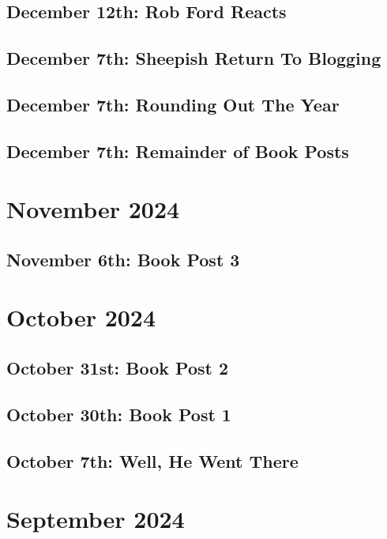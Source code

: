 \documentclass[12pt,letterpaper]{report}
\begin{document}
\subsection{December 12th: Rob Ford Reacts}

\subsection{December 7th: Sheepish Return To Blogging}

\subsection{December 7th: Rounding Out The Year}

\subsection{December 7th: Remainder of Book Posts}

\section{November 2024}
\subsection{November 6th: Book Post 3}

\section{October 2024}
\subsection{October 31st: Book Post 2}

\subsection{October 30th: Book Post 1}

\subsection{October 7th: Well, He Went There}

\section{September 2024}
\end{document}
